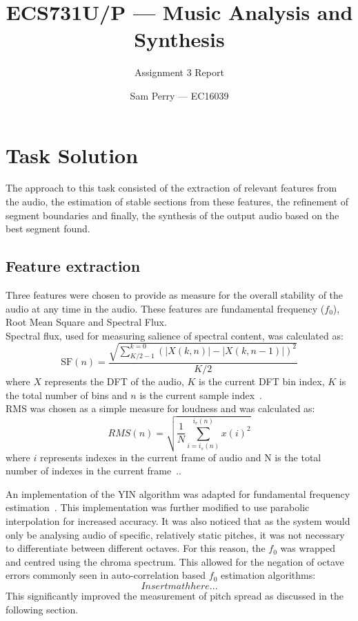 \documentclass[titlepage]{scrartcl}
\begin{document}
\title{ECS731U/P --- Music Analysis and Synthesis}
\subtitle{\LARGE{Assignment 3 Report}}
\author{Sam Perry --- EC16039}

\maketitle

\section{Task Solution}
The approach to this task consisted of the extraction of relevant features from
the audio, the estimation of stable sections from these features, the
refinement of segment boundaries and finally, the synthesis of the output audio
based on the best segment found.

\subsection{Feature extraction}
Three features were chosen to provide as measure for the overall stability of
the audio at any time in the audio. These features are fundamental frequency
($f_0$), Root Mean Square and Spectral Flux.\\
Spectral flux, used for measuring salience of spectral content, was calculated as:
$$
\text{SF}(n) =
\frac{\sqrt{\sum_{K/2-1}^{k=0}(|X(k,n)|-|X(k,n-1)|)^2}}{K/2}
$$
where $X$ represents the DFT of the audio, $K$ is the current DFT bin index, $K$ is
the total number of bins and $n$ is the current sample
index~\parencite{Lerch2012}.\\
RMS was chosen as a simple measure for loudness and was calculated as:
$$RMS(n) = \sqrt{\frac{1}{N}\sum_{i=i_s(n)}^{i_e(n)}{x(i)^2}}$$
where $i$ represents indexes in the current frame of audio and N is the total
number of indexes in the current frame~\parencite{Lerch2012}..

An implementation of the YIN algorithm was adapted for fundamental frequency
estimation~\parencite[p352-353]{Zolzer2011}. This implementation was further
modified to use parabolic interpolation for increased accuracy.
It was also noticed that as the system would only be analysing audio of
specific, relatively static pitches, it was not necessary to differentiate
between different octaves. For this reason, the $f_0$ was wrapped and centred
using the chroma spectrum. This allowed for the negation of octave errors
commonly seen in auto-correlation based $f_0$ estimation algorithms:
$$ Insert math here...$$
This significantly improved the measurement of pitch spread as discussed in
the following section.
\end{document}
